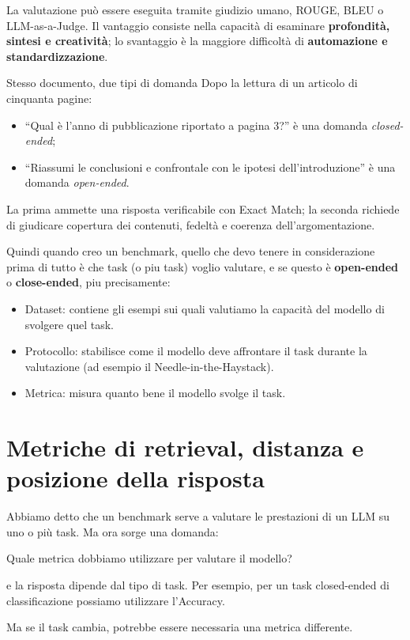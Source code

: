 La valutazione può essere eseguita tramite giudizio umano, ROUGE, BLEU o LLM-as-a-Judge. Il vantaggio consiste nella capacità di esaminare \textbf{profondità, sintesi e creatività}; lo svantaggio è la maggiore difficoltà di \textbf{automazione e standardizzazione}.

\begin{example}{Stesso documento, due tipi di domanda}
Dopo la lettura di un articolo di cinquanta pagine:
\begin{itemize}
\item ``Qual è l'anno di pubblicazione riportato a pagina 3?'' è una domanda \emph{closed-ended};
\item ``Riassumi le conclusioni e confrontale con le ipotesi dell'introduzione'' è una domanda \emph{open-ended}.
\end{itemize}
La prima ammette una risposta verificabile con Exact Match; la seconda richiede di giudicare copertura dei contenuti, fedeltà e coerenza dell'argomentazione.
\end{example}

Quindi quando creo un benchmark, quello che devo tenere in considerazione prima di tutto è che task (o piu task) voglio valutare, e se questo è \textbf{open-ended} o \textbf{close-ended}, piu precisamente:
\begin{itemize}
    \item Dataset: contiene gli esempi sui quali valutiamo la capacità del modello di svolgere quel task.
    \item Protocollo: stabilisce come il modello deve affrontare il task durante la valutazione (ad esempio il Needle-in-the-Haystack).
    \item Metrica: misura quanto bene il modello svolge il task.
\end{itemize}


\section{Metriche di retrieval, distanza e posizione della risposta}
Abbiamo detto che un benchmark serve a valutare le prestazioni di un LLM su uno o più task. Ma ora sorge una domanda:
\begin{center}
    Quale metrica dobbiamo utilizzare per valutare il modello?
\end{center}
e la risposta dipende dal tipo di task.
Per esempio, per un task closed-ended di classificazione possiamo utilizzare l'Accuracy.

Ma se il task cambia, potrebbe essere necessaria una metrica differente.\\

